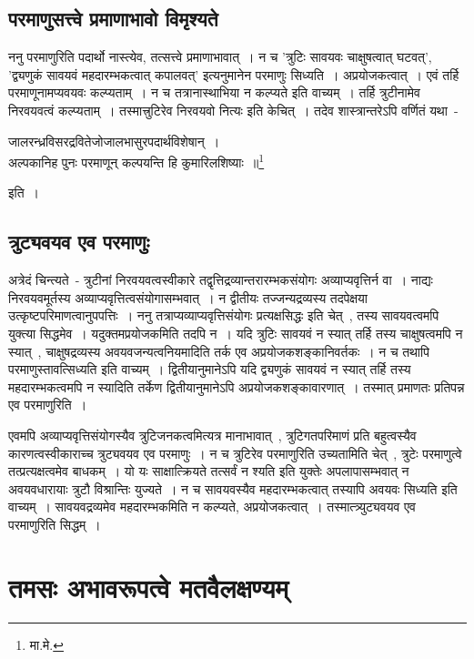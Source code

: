 		\subsection{परमाणुसत्त्वे प्रमाणाभावो विमृश्यते}

		ननु परमाणुरिति पदार्थो नास्त्येव, तत्सत्त्वे प्रमाणाभावात्~। न च 'त्रुटिः सावयवः चाक्षुषत्वात् घटवत्', 'द्व्यणुकं सावयवं महदारम्भकत्वात् कपालवत्' इत्यनुमानेन परमाणुः सिध्यति~। अप्रयोजकत्वात्~। एवं तर्हि परमाणूनामप्यवयवः कल्प्यताम्~। न च तत्रानास्थाभिया न कल्प्यते इति वाच्यम्~। तर्हि त्रुटीनामेव निरवयवत्वं कल्प्यताम्~। तस्मात्त्रुटिरेव निरवयवो नित्यः इति केचित्~। तदेव शास्त्रान्तरेऽपि वर्णितं यथा~- {\fontsize{11.7}{0}\selectfont\s  \begin{center}जालरन्ध्रविसरद्रवितेजोजालभासुरपदार्थविशेषान्~।\\ अल्पकानिह पुनः परमाणून् कल्पयन्ति हि कुमारिलशिष्याः~॥\footnote{मा.मे.}\end{center}} इति~।

		\subsection{त्रुट्यवयव एव परमाणुः}

		अत्रेदं चिन्त्यते~- त्रुटीनां निरवयवत्वस्वीकारे तद्वृत्तिद्रव्यान्तरारम्भकसंयोगः अव्याप्यवृत्तिर्न वा~। नाद्यः निरवयवमूर्तस्य अव्याप्यवृत्तित्वसंयोगासम्भवात्~। न द्वीतीयः तज्जन्यद्रव्यस्य तदपेक्षया उत्कृष्टपरिमाणत्वानुपपत्तिः~। ननु  तत्राप्यव्याप्यवृत्तिसंयोगः प्रत्यक्षसिद्धः इति चेत्~, तस्य सावयवत्वमपि युक्त्या सिद्धमेव~। यदुक्तमप्रयोजकमिति तदपि न~। यदि त्रुटिः सावयवं न स्यात् तर्हि तस्य चाक्षुषत्वमपि न स्यात्~, चाक्षुषद्रव्यस्य अवयवजन्यत्वनियमादिति तर्क एव अप्रयोजकशङ्कानिवर्तकः~। न च तथापि परमाणुस्तावत्सिध्यति इति वाच्यम्~। द्वितीयानुमानेऽपि यदि द्व्यणुकं सावयवं न स्यात् तर्हि तस्य महदारम्भकत्वमपि न स्यादिति तर्केण द्वितीयानुमानेऽपि अप्रयोजकशङ्कावारणात्~। तस्मात् प्रमाणतः प्रतिपन्न एव परमाणुरिति~।

		एवमपि अव्याप्यवृत्तिसंयोगस्यैव त्रुटिजनकत्वमित्यत्र मानाभावात्~, त्रुटिगतपरिमाणं प्रति बहुत्वस्यैव कारणत्वस्वीकाराच्च त्रुट्यवयव एव परमाणुः~। न च त्रुटिरेव परमाणुरिति उच्यतामिति चेत्~, त्रुटेः परमाणुत्वे तत्प्रत्यक्षत्वमेव बाधकम्~। यो यः साक्षात्क्रियते तत्सर्वं न श्यति इति युक्तेः अपलापासम्भवात् न अवयवधारायाः त्रुटौ विश्रान्तिः युज्यते~। न च सावयवस्यैव महदारम्भकत्वात् तस्यापि अवयवः सिध्यति इति वाच्यम्~। सावयवद्रव्यमेव महदारम्भकमिति न कल्प्यते, अप्रयोजकत्वात्~। तस्मात्त्र्युट्यवयव एव परमाणुरिति सिद्धम्~।

	\section{तमसः अभावरूपत्वे मतवैलक्षण्यम्}
	

